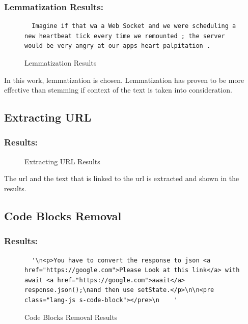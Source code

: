 \subsubsection{Lemmatization Results:} \label{stemming-vs-lemmatization_results_results_1}

\begin{figure}[H]
\noindent\begin{lstlisting}
  Imagine if that wa a Web Socket and we were scheduling a new heartbeat tick every time we remounted ; the server would be very angry at our apps heart palpitation .
\end{lstlisting}

\caption{Lemmatization Results}
\label{fig:stemming-vs-lemmatization_results_results_1}
\end{figure}

\noindent In this work, lemmatization is chosen. Lemmatization has proven to be more effective than stemming if context of the text is taken into consideration. 

\subsection{Extracting URL} \label{extracting-url_results}
\subsubsection{Results:} \label{extracting-url_results_results}
\begin{figure}[H]
\noindent{}
\caption{Extracting URL Results}
\label{fig:extracting-url_results_results}
\end{figure}
The url and the text that is linked to the url is extracted and shown in the results.

\subsection{Code Blocks Removal } \label{code-blocks-removal_results}
\subsubsection{Results:} \label{code-blocks-removal_results_results}
\begin{figure}[H]
\noindent\begin{lstlisting}
  '\n<p>You have to convert the response to json <a href="https://google.com">Please Look at this link</a> with await <a href="https://google.com">await</a> response.json();\nand then use setState.</p>\n\n<pre class="lang-js s-code-block"></pre>\n    '
\end{lstlisting}

\caption{Code Blocks Removal Results}
\label{fig:code-blocks-removal_results_results}
\end{figure} 

